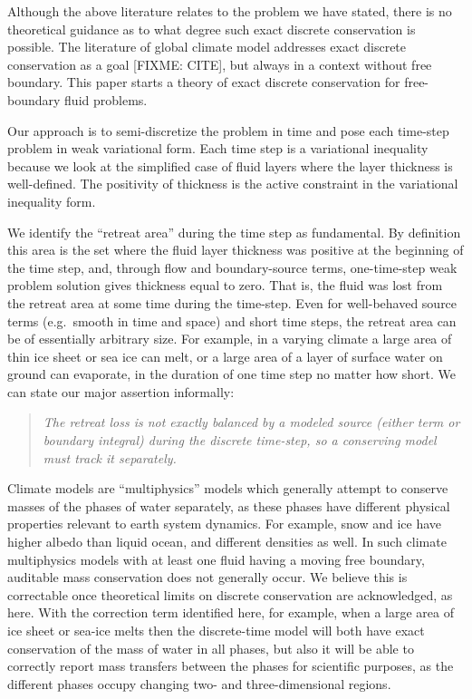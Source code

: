 \documentclass[final,leqno,onefignum,onetabnum]{siamltex1213bueler}
\begin{document}
Although the above literature relates to the problem we have stated, there is no theoretical guidance as to what degree such exact discrete conservation is possible.  The literature of global climate model addresses exact discrete conservation as a goal [FIXME: CITE], but always in a context without free boundary.  This paper starts a theory of exact discrete conservation for free-boundary fluid problems.

Our approach is to semi-discretize the problem in time and pose each time-step problem in weak variational form.  Each time step is a variational inequality because we look at the simplified case of fluid layers where the layer thickness is well-defined.  The positivity of thickness is the active constraint in the variational inequality form.

We identify the ``retreat area'' during the time step as fundamental.  By definition this area is the set where the fluid layer thickness was positive at the beginning of the time step, and, through flow and boundary-source terms, one-time-step weak problem solution gives thickness equal to zero.  That is, the fluid was lost from the retreat area at some time during the time-step.  Even for well-behaved source terms (e.g.~smooth in time and space) and short time steps, the retreat area can be of essentially arbitrary size.  For example, in a varying climate a large area of thin ice sheet or sea ice can melt, or a large area of a layer of surface water on ground can evaporate, in the duration of one time step no matter how short.  We can state our major assertion informally:
\begin{quote}
\emph{The retreat loss is not exactly balanced by a modeled source (either term or boundary integral) during the discrete time-step, so a conserving model must track it separately.}
\end{quote}

Climate models are ``multiphysics'' models which generally attempt to conserve masses of the phases of water separately, as these phases have different physical properties relevant to earth system dynamics.  For example, snow and ice have higher albedo than liquid ocean, and different densities as well.  In such climate multiphysics models with at least one fluid having a moving free boundary, auditable mass conservation does not generally occur.  We believe this is correctable once theoretical limits on discrete conservation are acknowledged, as here.  With the correction term identified here, for example, when a large area of ice sheet or sea-ice melts then the discrete-time model will both have exact conservation of the mass of water in all phases, but also it will be able to correctly report mass transfers between the phases for scientific purposes, as the different phases occupy changing two- and three-dimensional regions.
\end{document}
